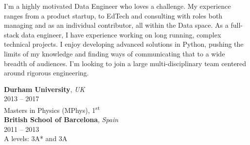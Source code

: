\documentclass[a4paper]{limecv}
\begin{document}
  
  \begin{cvSidebar}
   

    \begin{cvContact}
    \end{cvContact}
  
    \begin{cvProfile}
      \begin{flushleft}
      I'm a highly motivated Data Engineer who loves a challenge. My experience ranges from a product startup,
      to EdTech and consulting with roles both managing and as an individual contributor, all within the Data space.
      As a full-stack data engineer, I have experience working on long running, complex technical 
      projects. I enjoy developing advanced solutions in Python, pushing the limits of my knowledge and finding ways of 
      communicating that to a wide breadth of audiences. I'm looking to join a large multi-disciplinary team 
      centered around rigorous engineering.
      \end{flushleft}
    \end{cvProfile}

    \begin{cvEducationSide}
      \begin{flushleft}
      \textbf{Durham University}, \textit{UK}\\
      \vspace{0.1cm}
      2013 -- 2017\\
      \vspace{0.1cm} 
      Masters in Physics (MPhys), 1\textsuperscript{st}\\

      \vspace{0.3cm} 
      \textbf{British School of Barcelona}, \textit{Spain}\\
      \vspace{0.1cm}
      2011 -- 2013\\
      \vspace{0.1cm}
      A levels: 3A* and 3A
      \end{flushleft}
    \end{cvEducationSide}


\end{cvSidebar}
\end{document}
